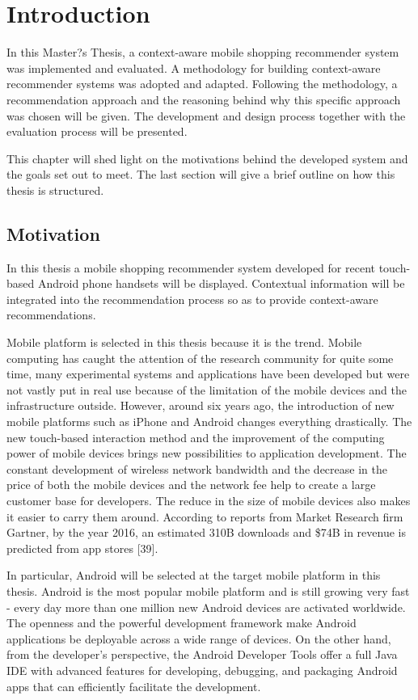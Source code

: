 \chapter{Introduction}\label{chapter:introduction}

In this Master?s Thesis, a context-aware mobile shopping recommender system was implemented and evaluated. A methodology for building context-aware recommender systems was adopted and adapted. Following the methodology, a recommendation approach and the reasoning behind why this specific approach was chosen will be given. The development and design process together with the evaluation process will be presented.

This chapter will shed light on the motivations behind the developed system and the goals set out to meet. The last section will give a brief outline on how this thesis is structured.

\section{Motivation} \label{sec:mv}

In this thesis a mobile shopping recommender system developed for recent touch-based Android phone handsets will be displayed. Contextual information will be integrated into the recommendation process so as to provide context-aware recommendations.

Mobile platform is selected in this thesis because it is the trend. Mobile computing has caught the attention of the research community for quite some time, many experimental systems and applications have been developed but were not vastly put in real use because of the limitation of the mobile devices and the infrastructure outside. However, around six years ago, the introduction of new mobile platforms such as iPhone and Android changes everything drastically. The new touch-based interaction method and the improvement of the computing power of mobile devices brings new possibilities to application development. The constant development of wireless network bandwidth and the decrease in the price of both the mobile devices and the network fee help to create a large customer base for developers. The reduce in the size of mobile devices also makes it easier to carry them around. According to reports from Market Research firm Gartner, by the year 2016, an estimated 310B downloads and \$74B in revenue is predicted from app stores [39]. 

In particular, Android will be selected at the target mobile platform in this thesis. Android is the most popular mobile platform and is still growing very fast - every day more than one million new Android devices are activated worldwide. The openness and the powerful development framework make Android applications be deployable across a wide range of devices. On the other hand, from the developer's perspective, the Android Developer Tools offer a full Java IDE with advanced features for developing, debugging, and packaging Android apps that can efficiently facilitate the development.

